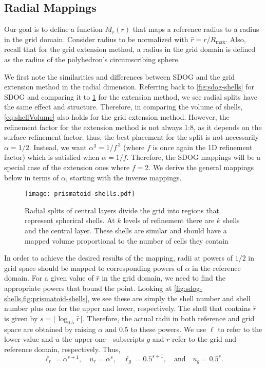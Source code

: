 \subsection{Radial Mappings} \label{chap:6:radial}
Our goal is to define a function $M_r(r)$ that maps a reference radius to a radius in the grid domain.
Consider radius to be normalized with $\hat{r} = r / R_\mathrm{max}$.
Also, recall that for the grid extension method, a radius in the grid domain is defined as the radius of the polyhedron's circumscribing sphere.


We first note the similarities and differences between SDOG and the grid extension method in the radial dimension.
Referring back to \cref{fig:sdog-shells} for SDOG and comparing it to \cref{fig:prismatoid-shells} for the extension method, we see radial splits have the same effect and structure.
Therefore, in comparing the volume of shells, \cref{eq:shellVolume} also holds for the grid extension method.
However, the refinement factor for the extension method is not always 1:8, as it depends on the surface refinement factor; thus, the best placement for the split is not necessarily $\alpha = 1/2$.
Instead, we want $\alpha^3 = 1 / f^{\ 3}$ (where $f$ is once again the 1D refinement factor) which is satisfied when $\alpha = 1/f$.
Therefore, the SDOG mappings will be a special case of the extension ones where $f = 2$.
We derive the general mappings below in terms of $\alpha$, starting with the inverse mappings.


\begin{figure}[ht!]
	\centering
	\texttt{[image: prismatoid-shells.pdf]}
	\caption[Spherical shells that result from the grid extension method]{
		Radial splits of central layers divide the grid into regions that represent spherical shells.
		At $k$ levels of refinement there are $k$ shells and the central layer.
		These shells are similar and should have a mapped volume proportional to the number of cells they contain
	}
	\label{fig:prismatoid-shells}
\end{figure}

In order to achieve the desired results of the mapping, radii at powers of $1/2$ in grid space should be mapped to corresponding powers of $\alpha$ in the reference domain.
For a given value of $\hat{r}$ in the grid domain, we need to find the appropriate powers that bound the point.
Looking at \cref{fig:sdog-shells,fig:prismatoid-shells}, we see these are simply the shell number and shell number plus one for the upper and lower, respectively.
The shell that contains $\hat{r}$ is given by $s = \lfloor \log_{0.5} \hat{r} \rfloor$.
Therefore, the actual radii in both reference and grid space are obtained by raising $\alpha$ and $0.5$ to these powers.
We use $\ell$ to refer to the lower value and $u$ the upper one---subscripts $g$ and $r$ refer to the grid and reference domain, respectively.
Thus,
%
\begin{equation*}
\ell_r = \alpha^{s + 1}, \quad u_r = \alpha^s, \quad \ell_g = 0.5^{s + 1}, \quad \text{and} \quad u_g = 0.5^s.
\end{equation*}
%


